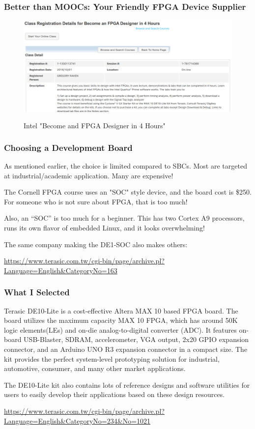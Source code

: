 \documentclass{beamer}
\begin{document}
\begin{frame}
\frametitle{Better than MOOCs:  Your Friendly FPGA Device Supplier}

\begin{figure}[h]
	\centering
	\includegraphics[width=1.0\textwidth]{graphics/fpga_designer_in_4hours.png}
	\centering\bfseries
	\caption{Intel "Become and FPGA Designer in 4 Hours"}
\end{figure}

\end{frame}



\begin{frame}
\frametitle{Choosing a Development Board}

As mentioned earlier, the choice is limited compared to SBCs.  Most are targeted at  industrial/academic application.  Many are expensive!

The Cornell FPGA course uses an "SOC" style device, and the board cost is \$250.
For someone who is not sure about FPGA, that is too much!

Also, an ``SOC'' is too much for a beginner.  This has two Cortex A9 processors, runs its own flavor of embedded Linux, and it looks overwhelming!

The same company making the DE1-SOC also makes others:

{\tiny \url{https://www.terasic.com.tw/cgi-bin/page/archive.pl?Language=English&CategoryNo=163}}

\end{frame}

\begin{frame}
\frametitle{What I Selected}

Terasic DE10-Lite is a cost-effective Altera MAX 10 based FPGA board. The board utilizes the maximum capacity MAX 10 FPGA, which has around 50K logic elements(LEs) and on-die analog-to-digital converter (ADC). It features on-board USB-Blaster, SDRAM, accelerometer, VGA output, 2x20 GPIO expansion connector, and an Arduino UNO R3 expansion connector in a compact size. The kit provides the perfect system-level prototyping solution for industrial, automotive, consumer, and many other market applications.

The DE10-Lite kit also contains lots of reference designs and software utilities for users to easily develop their applications based on these design resources.

{\tiny
\url{https://www.terasic.com.tw/cgi-bin/page/archive.pl?Language=English&CategoryNo=234&No=1021}}

\end{frame}
\end{document}
